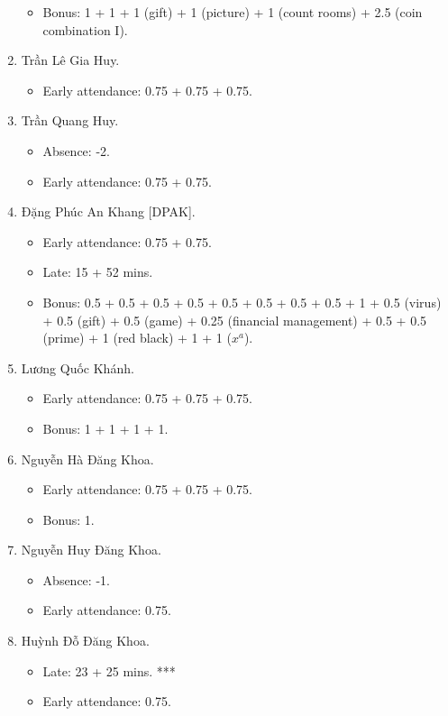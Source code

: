 \documentclass{article}
\begin{document}
\begin{enumerate}
\begin{itemize}
		\item Bonus: 1 + 1 + 1 (gift) + 1 (picture) + 1 (count rooms) + 2.5 (coin combination I).
	\end{itemize}
	\item {\sc Trần Lê Gia Huy.}
	\begin{itemize}
		\item Early attendance: 0.75 + 0.75 + 0.75.
	\end{itemize}
	\item {\sc Trần Quang Huy.}
	\begin{itemize}
		\item Absence: -2.
		\item Early attendance: 0.75 + 0.75.
	\end{itemize}
	\item {\sc Đặng Phúc An Khang [DPAK].}
	\begin{itemize}
		\item Early attendance: 0.75 + 0.75.
		\item Late: 15 + 52 mins.
		\item Bonus: 0.5 + 0.5 + 0.5 + 0.5 + 0.5 + 0.5 + 0.5 + 0.5 + 1 + 0.5 (virus) + 0.5 (gift) + 0.5 (game) + 0.25 (financial management) + 0.5 + 0.5 (prime) + 1 (red black) + 1 + 1 ($x^a$).
	\end{itemize}
	\item {\sc Lương Quốc Khánh.}
	\begin{itemize}
		\item Early attendance: 0.75 + 0.75 + 0.75.
		\item Bonus: 1 + 1 + 1 + 1.
	\end{itemize}
	\item {\sc Nguyễn Hà Đăng Khoa}.
	\begin{itemize}
		\item Early attendance: 0.75 + 0.75 + 0.75.
		\item Bonus: 1.
	\end{itemize}
	\item {\sc Nguyễn Huy Đăng Khoa.}
	\begin{itemize}
		\item Absence: -1.
		\item Early attendance: 0.75.
	\end{itemize}
	\item {\sc Huỳnh Đỗ Đăng Khoa.}
	\begin{itemize}
		\item Late: 23 + 25 mins. ***
		\item Early attendance: 0.75.

\end{itemize}
\end{enumerate}
\end{document}
